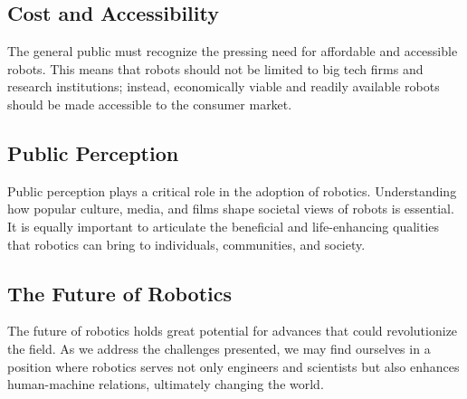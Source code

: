 \subsection{Cost and Accessibility}

The general public must recognize the pressing need for affordable and accessible robots. This means that robots should not be limited to big tech firms and research institutions; instead, economically viable and readily available robots should be made accessible to the consumer market.

\subsection{Public Perception}

Public perception plays a critical role in the adoption of robotics. Understanding how popular culture, media, and films shape societal views of robots is essential. It is equally important to articulate the beneficial and life-enhancing qualities that robotics can bring to individuals, communities, and society.

\subsection{The Future of Robotics}

The future of robotics holds great potential for advances that could revolutionize the field. As we address the challenges presented, we may find ourselves in a position where robotics serves not only engineers and scientists but also enhances human-machine relations, ultimately changing the world. \cite{christopherson,unknown-author-2024}
